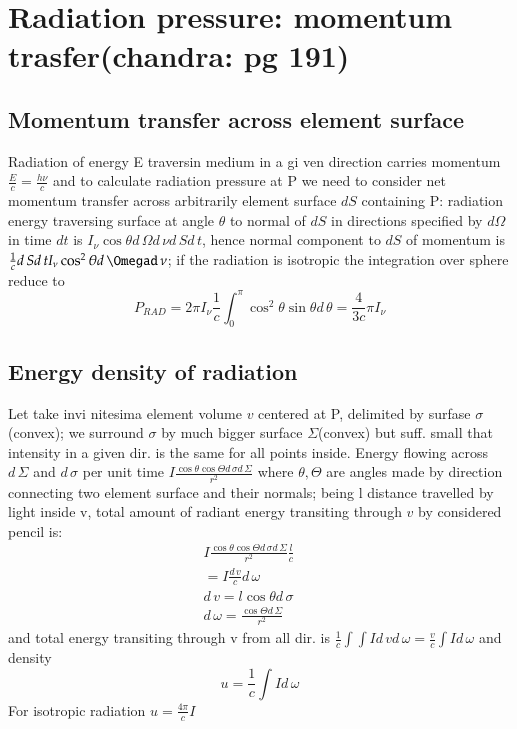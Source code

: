         \section{Radiation pressure: momentum trasfer(chandra: pg 191)}
            \subsection{Momentum transfer across element surface} 
                    Radiation of energy E traversin medium in a gi ven direction carries momentum $\frac{E}{c}=\frac{h\nu}{c}$ and to calculate radiation pressure at P we need to consider net momentum transfer across arbitrarily element surface $dS$ containing P: radiation energy traversing surface at angle $\theta$ to normal of $dS$ in directions specified by $d\Omega$ in time $dt$ is $I_{\nu}\cos{\theta}d\,\Omega d\,\nu d\,Sd\,t$, hence normal component to $dS$ of momentum is $\frac{1}{c}d\,Sd\,tI_{\nu}\cos^2{\theta}d\,\Omegad\,\nu$; if the radiation is isotropic the integration over sphere reduce to
                    \begin{equation*}
                    P_{RAD}=2\pi I_{\nu}\frac{1}{c}\int_0^{\pi}\cos^2{\theta}\sin{\theta}d\,\theta=\frac{4}{3c}\pi I_{\nu}    
                    \end{equation*}
            \subsection{Energy density of radiation}
                    Let take invi nitesima element volume $v$ centered at P, delimited by surfase $\sigma$(convex); we surround $\sigma$ by much bigger surface $\Sigma$(convex) but suff. small that intensity in a given dir. is the same for all points inside. Energy flowing across $d\,\Sigma$ and $d\,\sigma$ per unit time $I \frac{\cos{\theta}\cos{\Theta}d\,\sigma d\,\Sigma}{r^2}$ where $\theta,\Theta$ are angles made by direction connecting two element surface and their normals; being l distance travelled by light inside v, total amount of radiant energy transiting through $v$ by considered pencil is:
                    \begin{align*}
                    &I \frac{\cos{\theta}\cos{\Theta}d\,\sigma d\,\Sigma}{r^2}\frac{l}{c}\\
                    &=I \frac{d\,v}{c}d\,\omega\\
                    &d\,v=l\cos{\theta}d\,\sigma\\
                    &d\,\omega=\frac{\cos{\Theta}d\,\Sigma}{r^2}&\tag{solid angle}
                    &&\tag{subtended by $d\,\Sigma$ at P}
                    \end{align*}
                    and total energy transiting through v from all dir. is $\frac{1}{c}\int\int Id\,vd\,\omega=\frac{v}{c}\int Id\,\omega$ and density
                    \begin{equation}
                        u=\frac{1}{c}\int Id\,\omega
                    \end{equation}
                    For isotropic radiation $u=\frac{4\pi}{c}I$
